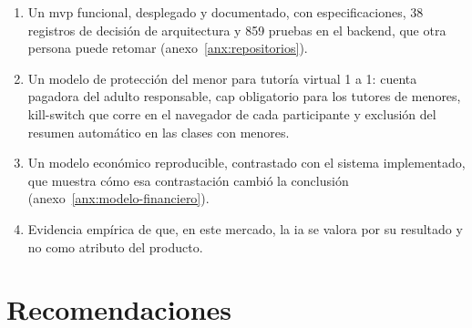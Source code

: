 \begin{enumerate}
    \item Un \gls{mvp} funcional, desplegado y documentado, con
          especificaciones, 38 registros de decisión de arquitectura y 859
          pruebas en el backend, que otra persona puede retomar
          (anexo~\ref{anx:repositorios}).
    \item Un modelo de protección del menor para tutoría virtual 1 a 1:
          cuenta pagadora del adulto responsable, \gls{cap} obligatorio
          para los tutores de menores, kill-switch que corre en el
          navegador de cada participante y exclusión del resumen
          automático en las clases con menores.
    \item Un modelo económico reproducible, contrastado con el sistema
          implementado, que muestra cómo esa contrastación cambió la
          conclusión (anexo~\ref{anx:modelo-financiero}).
    \item Evidencia empírica de que, en este mercado, la \gls{ia} se valora
          por su resultado y no como atributo del producto.
\end{enumerate}

\section{Recomendaciones}\label{sec:recomendaciones}

